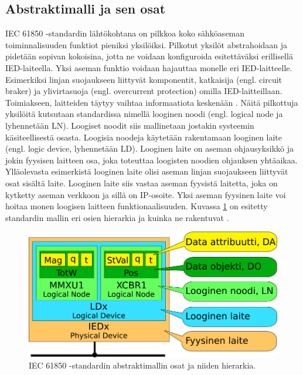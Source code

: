 \subsection{Abstraktimalli ja sen osat}
IEC 61850 -standardin lähtökohtana on pilkkoa koko sähköaseman toiminnalisuuden funktiot pieniksi yksilöiksi. Pilkotut yksilöt abstrahoidaan ja pidetään sopivan kokoisina, jotta ne voidaan konfiguroida esitettäväksi erillisellä IED-laiteella. Yksi aseman funktio voidaan hajauttaa monelle eri IED-laitteelle. Esimerkiksi linjan suojaukseen liittyvät komponentit, katkaisija (engl. circuit braker) ja ylivirtasuoja (engl. overcurrent protection) omilla IED-laitteillaan. Toimiakseen, laitteiden täytyy vaihtaa informaatiota keskenään \cite[s.~31]{IEC61850-7-1}. Näitä pilkottuja yksilöitä kutsutaan standardissa nimellä looginen noodi (engl. logical node ja lyhennetään LN). Loogiset noodit siis mallinetaan jostakin systeemin käsiteellisestä osasta. Loogisia noodeja käytetään rakentamaan looginen laite (engl. logic device, lyhennetään LD). Looginen laite on aseman ohjausyksikkö ja jokin fyysisen laitteen osa, joka toteuttaa loogisten noodien ohjauksen yhtäaikaa. Ylläolevasta esimerkistä looginen laite olisi aseman linjan suojaukseen liittyvät osat sisältä laite. Looginen laite siis vastaa aseman fyysistä laitetta, joka on kytketty aseman verkkoon ja sillä on IP-osoite. Yksi aseman fyysinen laite voi hoitaa monen loogisen laitteen funktionaalisuuden. Kuvassa \ref{fig:iec61850-data-modeling} on esitetty standardin mallin eri osien hierarkia ja kuinka ne rakentuvat \cite[s.~2]{Camachi2017} \cite[s.~24]{IEC61850-1}.

\begin{figure}
	\includegraphics[width=1\textwidth]{pictures/iec61850-data-modeling.png}
	\caption{IEC 61850 -standardin abstraktimallin osat ja niiden hierarkia.}
	\label{fig:iec61850-data-modeling}
\end{figure}

